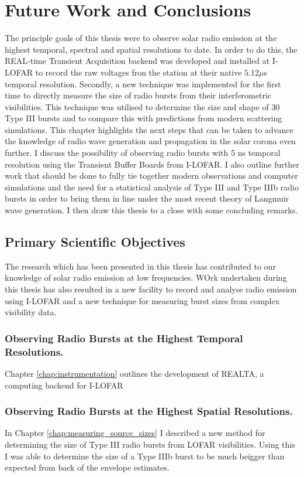 \doublespacing
\chapter{Future Work and Conclusions}
\label{chap:future}
The principle goals of this thesis were to observe solar radio emission at the highest temporal, spectral and spatial resolutions to date. In order to do this, the REAL-time Transient Acquisition backend was developed and installed at I-LOFAR to record the raw voltages fron the station at their native $5.12 \mu$s temporal resolution.
Secondly, a new technique was implemented for the first time to directly measure the size of radio bursts from their interferometric visibilities. This technique was utilised to determine the size and shape of 30 Type III bursts and to compare this with predictions from modern scattering simulations.
This chapter highlights the next steps that can be taken to advance the knowledge of radio wave generation and propagation in the solar corona even further. I discuss the possibility of observing radio bursts with 5 ns temporal resolution using the Transient Buffer Boards from I-LOFAR. I also outline further work that should be done to fully tie together modern observations and computer simulations and the need for a statistical analysis of Type III and Type IIIb radio bursts in order to bring them in line under the most recent theory of Langmuir wave generation. I then draw this thesis to a close with some concluding remarks.

\section{Primary Scientific Objectives}
The research which has been presented in this thesis has contributed to our knowledge of solar radio emission at low frequencies. WOrk undertaken during this thesis has also resulted in a new facility to record and analyse radio emission using I-LOFAR and a new technique for measuring burst sizes from complex visibility data.
\subsection{Observing Radio Bursts at the Highest Temporal Resolutions.}
Chapter \ref{chap:instrumentation} outlines the development of REALTA, a computing backend for I-LOFAR
\subsection{Observing Radio Bursts at the Highest Spatial Resolutions.}
In Chapter \ref{chap:measuring_source_sizes} I described a new method for determining the size of Type III radio bursts from LOFAR visibilities. Using this I was able to determine the size of a Type IIIb burst to be much beigger than expected from back of the envelope estimates.
